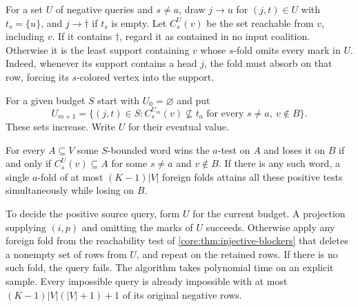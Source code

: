 For a set $U$ of negative queries and $s\ne a$, draw $j\to u$ for
$(j,t)\in U$ with $t_s=\{u\}$, and $j\to\dagger$ if $t_s$ is empty.
Let $C_s^U(v)$ be the set reachable from $v$, including $v$.
If it contains $\dagger$, regard it as contained in no input coalition.
Otherwise it is the least support containing $v$ whose $s$-fold
omits every mark in $U$. Indeed, whenever its support contains a
head $j$, the fold must absorb on that row, forcing its $s$-colored
vertex into the support.

For a given budget $S$ start with $U_0=\varnothing$ and put
\[
 U_{m+1}=\bigl\{(j,t)\in S:
   C_s^{U_m}(v)\not\subseteq t_a
   \text{ for every }s\ne a,\ v\notin B\bigr\}.
\]
These sets increase. Write $U$ for their eventual value.

\begin{theorem}
\label{core:thm:disjoint-foreign-guards}
For every $A\subseteq V$ some $S$-bounded word wins the $a$-test on
$A$ and loses it on $B$ if and only if $C_s^U(v)\subseteq A$ for
some $s\ne a$ and $v\notin B$. If there is any such word, a single
$a$-fold of at most $(K-1)|V|$ foreign folds attains all these positive
tests simultaneously while losing on $B$.

To decide the positive source query, form $U$ for the current budget.
A projection supplying $(i,p)$ and omitting the marks of $U$ succeeds.
Otherwise apply any foreign fold from the reachability test of
\cref{core:thm:injective-blockers} that deletes a nonempty set of
rows from $U$, and repeat on the retained rows. If there is no such
fold, the query fails. The algorithm takes polynomial time on an
explicit sample. Every impossible query is already impossible with
at most $(K-1)|V|(|V|+1)+1$ of its original negative rows.
\end{theorem}
